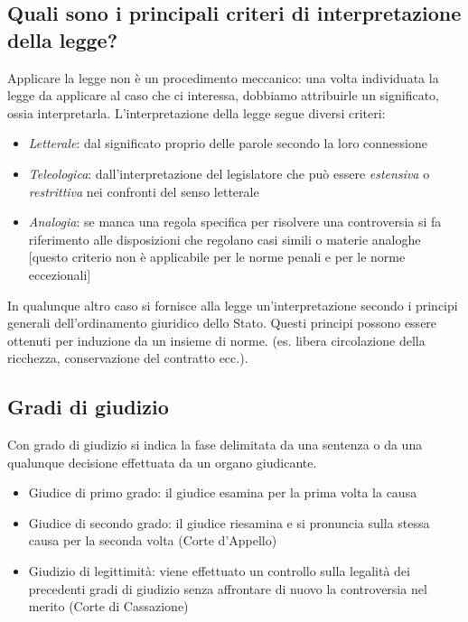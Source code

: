 \subsection{Quali sono i principali criteri di interpretazione della legge?}
Applicare la legge non è un procedimento meccanico: una volta individuata la legge da applicare al caso che 
ci interessa, dobbiamo attribuirle un significato, ossia interpretarla.\newline
L'interpretazione della legge segue diversi criteri:
\begin{itemize}
    \item \emph{Letterale}: dal significato proprio delle parole secondo la loro connessione
    \item \emph{Teleologica}: dall'interpretazione del legislatore che può essere \emph{estensiva} o \emph{restrittiva} nei
        confronti del senso letterale
    \item \emph{Analogia}: se manca una regola specifica per risolvere una controversia si fa riferimento alle disposizioni che
        regolano casi simili o materie analoghe [questo criterio non è applicabile per le norme penali e per 
        le norme eccezionali]
\end{itemize}
In qualunque altro caso si fornisce alla legge un'interpretazione secondo i principi generali
dell'ordinamento giuridico dello Stato. Questi principi possono essere ottenuti per induzione da un insieme di norme.
(es. libera circolazione della ricchezza, conservazione del contratto ecc.).

\subsection{Gradi di giudizio}
Con grado di giudizio si indica la fase delimitata da una sentenza o da una qualunque decisione effettuata da un
organo giudicante.
\begin{itemize}
    \item Giudice di primo grado: il giudice esamina per la prima volta la causa
    \item Giudice di secondo grado: il giudice riesamina e si pronuncia sulla stessa causa per la
        seconda volta (Corte d'Appello)
    \item  Giudizio di legittimità: viene effettuato un controllo sulla legalità dei precedenti gradi
        di giudizio senza affrontare di nuovo la controversia nel merito (Corte di Cassazione)
\end{itemize}

